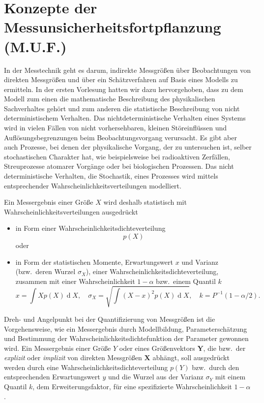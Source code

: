 \section{Konzepte der Messunsicherheitsfortpflanzung (M.U.F.)}


In der Messtechnik geht es darum, indirekte Messgrößen über Beobachtungen von direkten
Messgrößen und über ein Schätzverfahren auf Basis eines Modells zu ermitteln.
In der ersten Vorlesung hatten wir dazu hervorgehoben, dass zu dem Modell zum einen
die mathematische Beschreibung des physikalischen Sachverhaltes gehört und zum anderen
die statistische Beschreibung von nicht deterministischem Verhalten.
Das nichtdeterministische Verhalten eines Systems wird in vielen Fällen
von nicht vorhersehbaren, kleinen Störeinflüssen und Auflösungsbegrenzungen
beim Beobachtungsvorgang verursacht. Es gibt aber auch Prozesse, bei denen
der physikalische Vorgang, der zu untersuchen ist, selber stochastischen Charakter hat,
wie beispielsweise bei radioaktiven Zerfällen, Streuprozesse atomarer Vorgänge oder bei
biologischen Prozessen. Das nicht deterministische Verhalten, die
Stochastik, eines Prozesses wird mittels entsprechender Wahrscheinlichkeitsverteilungen modelliert.

Ein Messergebnis einer Größe $X$ wird deshalb statistisch mit Wahrscheinlichkeitsverteilungen ausgedrückt
\begin{itemize}
\item in Form einer Wahrscheinlichkeitsdichteverteilung
$$
p(X)
$$
oder
\item in Form der statistischen Momente, Erwartungswert $x$ und Varianz (bzw.\ deren Wurzel $\sigma_X$),
einer Wahrscheinlichkeitsdichteverteilung, zusammen mit einer Wahrscheinlichkeit $1-\alpha$
bzw.\ einem Quantil $k$
$$
x = \int X p(X) \operatorname d X, \quad
\sigma_X = \sqrt{\int (X-x)^2 p(X) \operatorname d X}, \quad k = P^{-1}(1-\alpha/2).
$$
\end{itemize}
Dreh- und Angelpunkt bei der Quantifizierung von Messgrößen ist die Vorgehensweise, wie ein
Mess\-er\-gebnis durch Modellbildung, Parameterschätzung und Bestimmung der Wahrscheinlichkeitsdichtefunktion
der Parameter gewonnen wird. Ein Messergebnis einer Größe $Y$ oder eines Größenvektors
$\mathbf{Y}$, die bzw.\ der \textsl{explizit} oder \textsl{implizit} von direkten
Messgrößen $\mathbf{X}$ abhängt, soll ausgedrückt werden durch eine
Wahrscheinlichkeitsdichteverteilung $p(Y)$ bzw.\ durch den entsprechenden Erwartungswert $y$ und
die Wurzel aus der Varianz $\sigma_Y$ mit einem Quantil $k$, dem Erweiterungsfaktor, für
eine spezifizierte Wahrscheinlichkeit $1-\alpha$.

